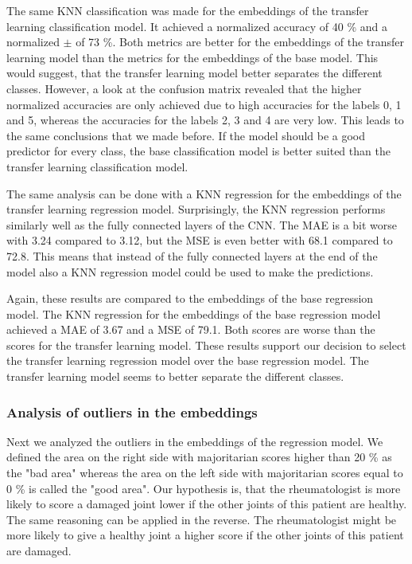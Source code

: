 \documentclass[12pt]{article}
\begin{document}
The same KNN classification was made for the embeddings of the transfer learning classification model. It achieved a normalized accuracy of 40 \% and a normalized $\pm$ of 73 \%. Both metrics are better for the embeddings of the transfer learning model than the metrics for the embeddings of the base model. This would suggest, that the transfer learning model better separates the different classes. However, a look at the confusion matrix revealed that the higher normalized accuracies are only achieved due to high accuracies for the labels 0, 1 and 5, whereas the accuracies for the labels 2, 3 and 4 are very low. This leads to the same conclusions that we made before. If the model should be a good predictor for every class, the base classification model is better suited than the transfer learning classification model.

The same analysis can be done with a KNN regression for the embeddings of the transfer learning regression model. Surprisingly, the KNN regression performs similarly well as the fully connected layers of the CNN. The MAE is a bit worse with 3.24 compared to 3.12, but the MSE is even better with 68.1 compared to 72.8. This means that instead of the fully connected layers at the end of the model also a KNN regression model could be used to make the predictions.

Again, these results are compared to the embeddings of the base regression model. The KNN regression for the embeddings of the base regression model achieved a MAE of 3.67 and a MSE of 79.1. Both scores are worse than the scores for the transfer learning model. These results support our decision to select the transfer learning regression model over the base regression model. The transfer learning model seems to better separate the different classes.

\subsubsection{Analysis of outliers in the embeddings}
\label{subsubsec:outliers_embeddings}

Next we analyzed the outliers in the embeddings of the regression model. We defined the area on the right side with majoritarian scores higher than 20 \% as the "bad area" whereas the area on the left side with majoritarian scores equal to 0 \% is called the "good area". Our hypothesis is, that the rheumatologist is more likely to score a damaged joint lower if the other joints of this patient are healthy. The same reasoning can be applied in the reverse. The rheumatologist might be more likely to give a healthy joint a higher score if the other joints of this patient are damaged.
\end{document}
